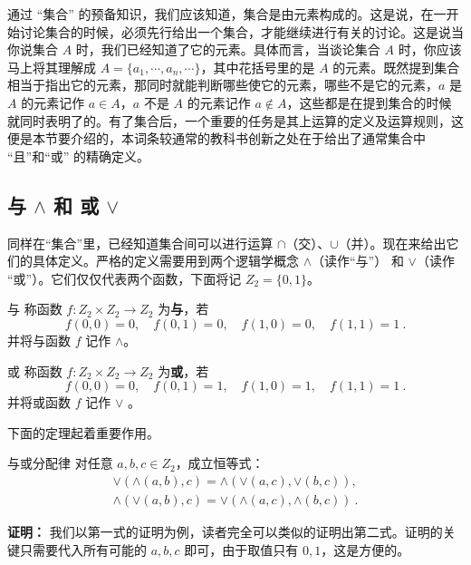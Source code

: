 
通过 “集合” 的预备知识，我们应该知道，集合是由元素构成的。这是说，在一开始讨论集合的时候，必须先行给出一个集合，才能继续进行有关的讨论。这是说当你说集合 $A$ 时，我们已经知道了它的元素。具体而言，当谈论集合 $A$ 时，你应该马上将其理解成 $A=\{a_1,\cdots,a_n,\cdots\}$，其中花括号里的是 $A$ 的元素。既然提到集合相当于指出它的元素，那同时就能判断哪些使它的元素，哪些不是它的元素，$a$ 是 $A$ 的元素记作 $a\in A$，$a$ 不是 $A$ 的元素记作 $a\notin A$，这些都是在提到集合的时候就同时表明了的。有了集合后，一个重要的任务是其上运算的定义及运算规则，这便是本节要介绍的，本词条较通常的教科书创新之处在于给出了通常集合中 “且”和“或” 的精确定义。
\subsection{与 $\land$ 和 或 $\lor$}
同样在“集合”里，已经知道集合间可以进行运算 $\cap$（交）、$\cup$（并）。现在来给出它们的具体定义。严格的定义需要用到两个逻辑学概念 $\land$（读作“与”） 和 $\lor$（读作 “或”）。它们仅仅代表两个函数，下面将记 $Z_2=\{0,1\}$。
\begin{definition}{与}\label{def_OpSet_2}
称函数 $f:Z_2\times Z_2\rightarrow Z_2$ 为\textbf{与}，若
\begin{equation}
f(0,0)=0,\quad f(0,1)=0,\quad f(1,0)=0,\quad f(1,1)=1~.
\end{equation}
并将与函数 $f$ 记作 $\land$。
\end{definition}
\begin{definition}{或}\label{def_OpSet_1}
称函数 $f:Z_2\times Z_2\rightarrow Z_2$ 为\textbf{或}，若
\begin{equation}
f(0,0)=0,\quad f(0,1)=1,\quad f(1,0)=1,\quad f(1,1)=1~.
\end{equation}
并将或函数 $f$ 记作 $\lor$ 。
\end{definition}
下面的定理起着重要作用。
\begin{theorem}{与或分配律}\label{the_OpSet_1}
对任意 $a,b,c\in Z_2$，成立恒等式：
\begin{equation}\label{eq_OpSet_1}
\begin{aligned}
\lor(\land(a,b),c)=\land(\lor(a,c),\lor(b,c)),\\
\land(\lor(a,b),c)=\lor(\land(a,c),\land(b,c))~.
\end{aligned}
\end{equation}
\end{theorem}
\textbf{证明：}
我们以第一式的证明为例，读者完全可以类似的证明出第二式。证明的关键只需要代入所有可能的 $a,b,c$ 即可，由于取值只有 $0,1$，这是方便的。

